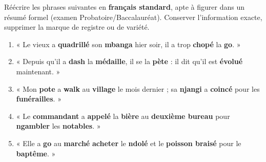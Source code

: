 \documentclass[11pt]{article}
\begin{document}
\begin{exercice}
Réécrire les phrases suivantes en \textbf{français standard}, apte à figurer dans un résumé formel (examen Probatoire/Baccalauréat). Conserver l'information exacte, supprimer la marque de registre ou de variété.
\begin{enumerate}
    \item « Le vieux a \textbf{quadrillé} son \textbf{mbanga} hier soir, il a trop \textbf{chopé} la \textbf{go}. »
    \item « Depuis qu'il a \textbf{dash} la \textbf{médaille}, il se la \textbf{pète} : il dit qu'il est \textbf{évolué} maintenant. »
    \item « Mon \textbf{pote} a \textbf{walk} au \textbf{village} le mois dernier ; sa \textbf{njangi} a \textbf{coincé} pour les \textbf{funérailles}. »
    \item « Le \textbf{commandant} a \textbf{appelé} la \textbf{bière} au \textbf{deuxième bureau} pour \textbf{ngambler} les \textbf{notables}. »
    \item « Elle a \textbf{go} au \textbf{marché} \textbf{acheter} le \textbf{ndolé} et le \textbf{poisson braisé} pour le \textbf{baptême}. »
\end{enumerate}
\end{exercice}
\end{document}
